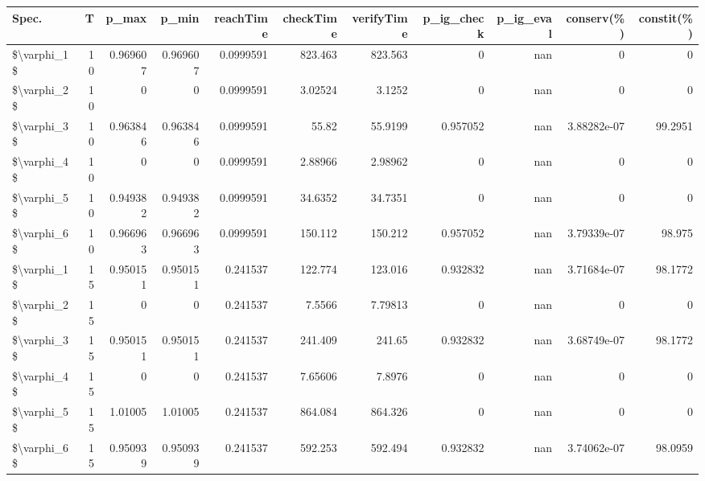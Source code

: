\begin{tabular}{lrrrrrrrrrr}
\hline
 Spec.       &   T &    p\_max &    p\_min &   reachTime &   checkTime &   verifyTime &   p\_ig\_check &   p\_ig\_eval &   conserv(\%) &   constit(\%) \\
\hline
 \$\textbackslash{}varphi\_1\$ &  10 & 0.969607 & 0.969607 &   0.0999591 &   823.463   &    823.563   &     0        &         nan &  0           &       0      \\
 \$\textbackslash{}varphi\_2\$ &  10 & 0        & 0        &   0.0999591 &     3.02524 &      3.1252  &     0        &         nan &  0           &       0      \\
 \$\textbackslash{}varphi\_3\$ &  10 & 0.963846 & 0.963846 &   0.0999591 &    55.82    &     55.9199  &     0.957052 &         nan &  3.88282e-07 &      99.2951 \\
 \$\textbackslash{}varphi\_4\$ &  10 & 0        & 0        &   0.0999591 &     2.88966 &      2.98962 &     0        &         nan &  0           &       0      \\
 \$\textbackslash{}varphi\_5\$ &  10 & 0.949382 & 0.949382 &   0.0999591 &    34.6352  &     34.7351  &     0        &         nan &  0           &       0      \\
 \$\textbackslash{}varphi\_6\$ &  10 & 0.966963 & 0.966963 &   0.0999591 &   150.112   &    150.212   &     0.957052 &         nan &  3.79339e-07 &      98.975  \\
 \$\textbackslash{}varphi\_1\$ &  15 & 0.950151 & 0.950151 &   0.241537  &   122.774   &    123.016   &     0.932832 &         nan &  3.71684e-07 &      98.1772 \\
 \$\textbackslash{}varphi\_2\$ &  15 & 0        & 0        &   0.241537  &     7.5566  &      7.79813 &     0        &         nan &  0           &       0      \\
 \$\textbackslash{}varphi\_3\$ &  15 & 0.950151 & 0.950151 &   0.241537  &   241.409   &    241.65    &     0.932832 &         nan &  3.68749e-07 &      98.1772 \\
 \$\textbackslash{}varphi\_4\$ &  15 & 0        & 0        &   0.241537  &     7.65606 &      7.8976  &     0        &         nan &  0           &       0      \\
 \$\textbackslash{}varphi\_5\$ &  15 & 1.01005  & 1.01005  &   0.241537  &   864.084   &    864.326   &     0        &         nan &  0           &       0      \\
 \$\textbackslash{}varphi\_6\$ &  15 & 0.950939 & 0.950939 &   0.241537  &   592.253   &    592.494   &     0.932832 &         nan &  3.74062e-07 &      98.0959 \\

\end{tabular}

